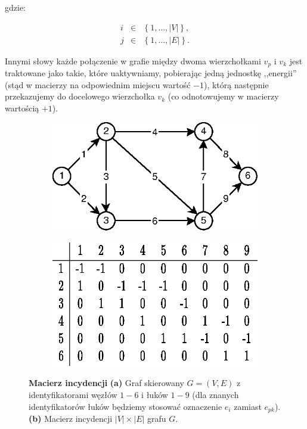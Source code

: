 gdzie:

\begin{equation}
	\begin{array}{lll}
	i & \in & \left\{ 1, \ldots, \left| V \right| \right\} \textrm{,} \\
	j & \in & \left\{ 1, \ldots, \left| E \right| \right\} \textrm{.}
	\end{array}
\end{equation}

Innymi słowy każde połączenie w grafie między dwoma wierzchołkami $v_{p}$ i $v_{k}$ jest traktowane jako takie, które uaktywniamy, pobierając jedną jednostkę ,,energii'' (stąd w macierzy na odpowiednim miejscu wartość $-1$), którą następnie przekazujemy do docelowego wierzchołka $v_{k}$ (co odnotowujemy w macierzy wartością $+1$).

\begin{figure}[!htbp]
	\centering
	\begin{subfigure}[b]{0.45\textwidth}
		\includegraphics[width=\textwidth]{Chapter_I/1/1_1a.eps}
		\caption{}
	\end{subfigure}%
	\qquad
	\begin{subfigure}[b]{0.45\textwidth}
		\includegraphics[width=\textwidth]{Chapter_I/1/1_1b.eps}
		\caption{}
	\end{subfigure}
	\caption{\textbf{Macierz incydencji} \textbf{(a)} Graf skierowany $G = \left( V, E \right)$ z identyfikatorami węzłów $1-6$ i łuków $1-9$ (dla znanych identyfikatorów łuków będziemy stosować oznaczenie $e_{i}$ zamiast $e_{pk}$). \textbf{(b)} Macierz incydencji $ \left| V \right| \times \left| E \right| $ grafu $G$.}\label{fig:incidenceMatrix}
\end{figure}

